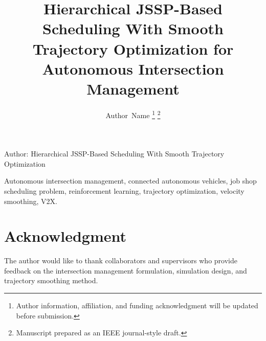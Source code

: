 \documentclass[journal]{IEEEtran}
\begin{document}
\title{Hierarchical JSSP-Based Scheduling With Smooth Trajectory Optimization for Autonomous Intersection Management}

\author{Author~Name%
\thanks{Author information, affiliation, and funding acknowledgment will be updated before submission.}%
\thanks{Manuscript prepared as an IEEE journal-style draft.}}

%
{Author: Hierarchical JSSP-Based Scheduling With Smooth Trajectory Optimization}

\maketitle

\begin{abstract}

\end{abstract}

\begin{IEEEkeywords}
Autonomous intersection management, connected autonomous vehicles, job shop scheduling problem, reinforcement learning, trajectory optimization, velocity smoothing, V2X.
\end{IEEEkeywords}

\IEEEpeerreviewmaketitle











\section*{Acknowledgment}
The author would like to thank collaborators and supervisors who provide feedback on the intersection management formulation, simulation design, and trajectory smoothing method.

\ifCLASSOPTIONcaptionsoff
  \newpage
\fi



\end{document}
